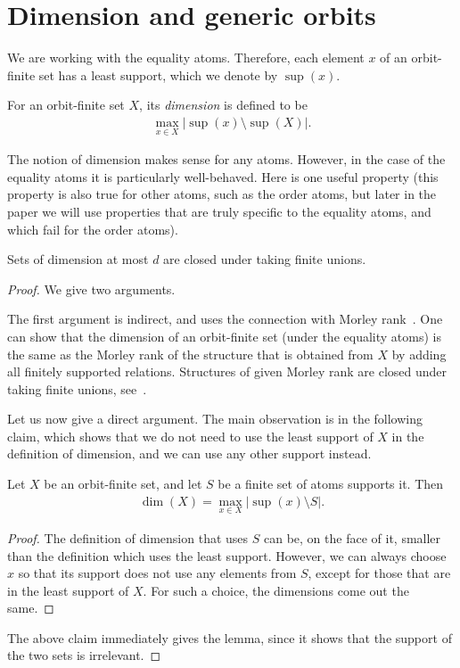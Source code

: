 \section{Dimension and generic orbits}
\label{sec:generic-orbits}  

We are working with the equality atoms. Therefore, each element $x$ of an orbit-finite set has a least support, which we denote by $\sup(x)$.
\begin{definition}
    [Dimension] \label{def:dimension} For an orbit-finite set $X$, its \emph{dimension} is defined to be 
    \begin{align*}
    \max_{x \in X} |\sup(x) \setminus \sup(X)|.
    \end{align*}
\end{definition}
The notion of dimension makes sense for any atoms. However, in the case of the equality atoms it is particularly well-behaved. Here is one useful property (this property is also true for other atoms, such as the order atoms, but later in the paper we will use properties that are truly specific to the equality atoms, and which fail for the order atoms).

\begin{lemma}\label{lem:dimension-unions}
    Sets of dimension at most $d$ are closed under taking finite unions. 
\end{lemma}
\begin{proof}
    We give two arguments.

    The first argument is indirect, and uses the connection with Morley rank~\cite[p.~240]{hodges1993model}. One can show that the dimension of an orbit-finite set (under the equality atoms) is the same as the Morley rank of the structure that is obtained from $X$ by adding all finitely supported relations. Structures of given Morley rank are closed under taking finite unions, see~\cite[p. 225]{Ziegler_2008}.

    Let us now give a direct argument. The main observation is in the following claim, which shows that we do not need to use the least support of $X$ in the definition of dimension, and we can use any other support instead.
    
    \begin{claim}\label{claim:dimension-supports}
        Let $X$ be an orbit-finite set, and let $S$ be a finite set of atoms supports it. Then 
        \begin{align*}
        \dim(X) = \max_{x \in X} |\sup(x) \setminus S|.
        \end{align*}
    \end{claim}
    \begin{proof}
        The definition of dimension that uses $S$ can be, on the face of it, smaller than the definition which uses the least support. However, we can always choose $x$ so that its support does not use any elements from $S$, except for those that are in the least support of $X$. For such a choice, the dimensions come out the same.
    \end{proof}
    The above claim immediately gives the lemma, since it shows that the support of the two sets is irrelevant.
\end{proof}

